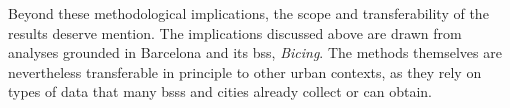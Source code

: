 Beyond these methodological implications, the scope and transferability of the results deserve mention. The implications discussed above are drawn from analyses grounded in Barcelona and its \ac{bss}, \textit{Bicing}. The methods themselves are nevertheless transferable in principle to other urban contexts, as they rely on types of data that many \acp{bss} and cities already collect or can obtain.